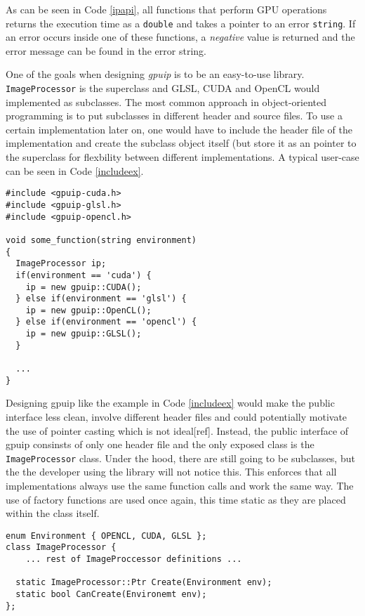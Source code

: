 As can be seen in Code \ref{ipapi}, all functions that perform GPU operations returns the execution time as a {\tt double} and takes a pointer to an error {\tt string}. If an error occurs inside one of these functions, a \emph{negative} value is returned and the error message can be found in the error string. 

One of the goals when designing \emph{gpuip} is to be an easy-to-use library. {\tt ImageProcessor} is the superclass and GLSL, CUDA and OpenCL would implemented as subclasses. The most common approach in object-oriented programming is to put subclasses in different header and source files. To use a certain implementation later on, one would have to include the header file of the implementation and create the subclass object itself (but store it as an pointer to the superclass for flexbility between different implementations. A typical user-case can be seen in Code \ref{includeex}.
\renewcommand{\lstlistingname}{Code}
\begin{lstlisting}[caption= Example of common use of object-oriented programming, label=includeex]
#include <gpuip-cuda.h>
#include <gpuip-glsl.h>
#include <gpuip-opencl.h>

void some_function(string environment)
{
  ImageProcessor ip;
  if(environment == 'cuda') {
    ip = new gpuip::CUDA();
  } else if(environment == 'glsl') {
    ip = new gpuip::OpenCL();
  } else if(environment == 'opencl') {
    ip = new gpuip::GLSL();
  }

  ...
}
\end{lstlisting}

Designing gpuip like the example in Code \ref{includeex} would make the public interface less clean, involve different header files and could potentially motivate the use of pointer casting which is not ideal[ref]. Instead, the public interface of gpuip consinsts of only one header file and the only exposed class is the {\tt ImageProcessor} class. Under the hood, there are still going to be subclasses, but the the developer using the library will not notice this. This enforces that all implementations always use the same function calls and work the same way. The use of factory functions are used once again, this time static as they are placed within the class itself.
\newline
\begin{lstlisting}[caption= {\tt ImageProcessor} static API, label=ipapi]
enum Environment { OPENCL, CUDA, GLSL };
class ImageProcessor {
    ... rest of ImageProccessor definitions ...

  static ImageProcessor::Ptr Create(Environment env);
  static bool CanCreate(Environemt env);
};
\end{lstlisting}

